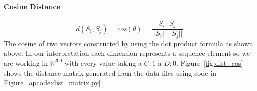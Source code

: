 \paragraph{Cosine Distance}
$$ d(S_i,S_j) = cos(\theta) = \frac{{S_i} \cdot {S_j}}{|| {S_i} || \; || {S_j} ||} $$
The cosine of two vectors constructed by using the dot product formula as shown above.
In our interpretation each dimension represents a sequence element so we are working in $\mathbb{R}^{200}$ with every value taking a $C:1$ a $D:0$.
Figure~\ref{fig:dist_cos} shows the distance matrix generated from the data files using code in Figure~\ref{apcode:dist_matrix.py}


